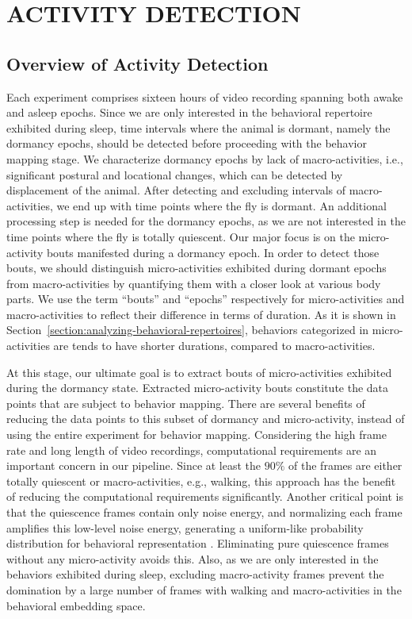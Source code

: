 \setlength{\parindent}{0pt}
\chapter{\bf ACTIVITY DETECTION}\label{chapter:activity-detection}
\section{Overview of Activity Detection}
Each experiment comprises sixteen hours of video recording spanning both awake and asleep epochs.
Since we are only interested in the behavioral repertoire exhibited during sleep, time intervals where the animal is dormant, namely the dormancy epochs, should be detected before proceeding with the behavior mapping stage.
We characterize dormancy epochs by lack of macro-activities, i.e., significant postural and locational changes, which can be detected by displacement of the animal.
After detecting and excluding intervals of macro-activities, we end up with time points where the fly is dormant.
An additional  processing step is needed for the dormancy epochs, as we are not interested in the time points where the fly is totally quiescent.
Our major focus is on the micro-activity bouts manifested during a dormancy epoch.
In order to detect those bouts, we should distinguish micro-activities exhibited during dormant epochs from macro-activities by quantifying them with a closer look at various body parts. We use the term ``bouts'' and ``epochs'' respectively for micro-activities and macro-activities to reflect their difference in terms of duration. As it is shown in Section~\ref{section:analyzing-behavioral-repertoires}, behaviors categorized in micro-activities are tends to have shorter durations, compared to macro-activities.

At this stage, our ultimate goal is to extract bouts of micro-activities exhibited during the dormancy state.
Extracted micro-activity bouts constitute the data points that are subject to behavior mapping.
There are several benefits of reducing the data points to this subset of dormancy and micro-activity, instead of using the entire experiment for behavior mapping.
Considering the high frame rate and long length of video recordings, computational requirements are an important concern in our pipeline.
Since  at least the $90\%$ of the frames are either totally quiescent or macro-activities, e.g., walking, this approach has the benefit of reducing the computational requirements significantly.
Another critical point is that the quiescence frames contain only noise energy, and normalizing each frame amplifies this low-level noise energy, generating a uniform-like probability distribution for behavioral representation \citep{todd_systematic_2017}.
Eliminating pure quiescence frames without any micro-activity avoids this.
Also, as we are only interested in the behaviors exhibited during sleep, excluding macro-activity frames prevent the domination by a large number of frames with walking and macro-activities in the behavioral embedding space.

